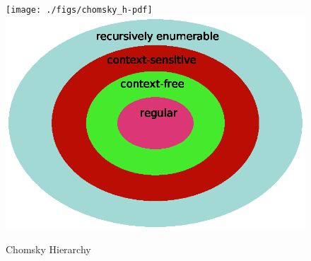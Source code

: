 \begin{figure}
	\begin{minipage}[t]{0.8\textwidth}
		\ifpdf
		\texttt{[image: ./figs/chomsky\_h-pdf]}
		\else
		\includegraphics[width=\linewidth,keepaspectratio=true]{./figs/chomsky_h-eps}
		\fi
		\caption{\small Chomsky Hierarchy}
		\label{mtv:ch}
	\end{minipage}
\end{figure}


